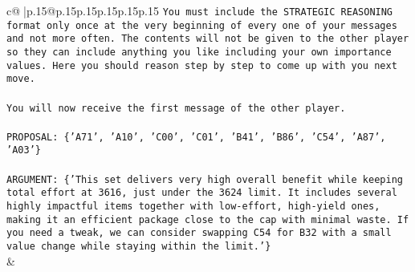 \documentclass{article}
\begin{document}
{\begin{supertabular}{c@{$\;$}|p{.15\linewidth}@{}p{.15\linewidth}p{.15\linewidth}p{.15\linewidth}p{.15\linewidth}p{.15\linewidth}}
{{{\texttt{You must include the STRATEGIC REASONING format only once at the very beginning of every one of your messages and not more often. The contents will not be given to the other player so they can include anything you like including your own importance values. Here you should reason step by step to come up with you next move.} \\
\\ 
\texttt{You will now receive the first message of the other player.} \\
\\ 
\texttt{PROPOSAL: \{'A71', 'A10', 'C00', 'C01', 'B41', 'B86', 'C54', 'A87', 'A03'\}} \\
\\ 
\texttt{ARGUMENT: \{'This set delivers very high overall benefit while keeping total effort at 3616, just under the 3624 limit. It includes several highly impactful items together with low{-}effort, high{-}yield ones, making it an efficient package close to the cap with minimal waste. If you need a tweak, we can consider swapping C54 for B32 with a small value change while staying within the limit.'\}} \\
            }
        }
    }
    & \\ \\


\end{supertabular}}
\end{document}
